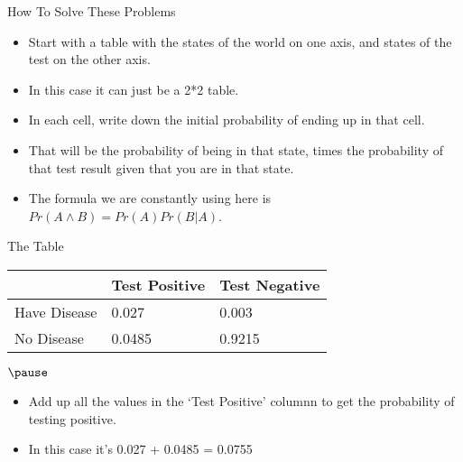 \documentclass[
  ignorenonframetext,
]{beamer}
\providecommand{\tightlist}{%
  \setlength{\itemsep}{0pt}\setlength{\parskip}{0pt}}
\renewcommand{\,}{\text{, }}
\begin{document}
\begin{frame}{How To Solve These Problems}
\protect\hypertarget{how-to-solve-these-problems}{}

\begin{itemize}
\tightlist
\item
  Start with a table with the states of the world on one axis, and
  states of the test on the other axis.
\item
  In this case it can just be a 2*2 table.
\item
  In each cell, write down the initial probability of ending up in that
  cell.
\item
  That will be the probability of being in that state, times the
  probability of that test result given that you are in that state.
\item
  The formula we are constantly using here is
  \(Pr(A \wedge B) = Pr(A) Pr(B | A)\).
\end{itemize}

\end{frame}

\begin{frame}{The Table}
\protect\hypertarget{the-table}{}

\begin{longtable}[]{@{}lll@{}}
\toprule
& Test Positive & Test Negative\tabularnewline
\midrule
\endhead
Have Disease & 0.027 & 0.003\tabularnewline
No Disease & 0.0485 & 0.9215\tabularnewline
\bottomrule
\end{longtable}

\(\pause\)

\begin{itemize}
\tightlist
\item
  Add up all the values in the `Test Positive' columnn to get the
  probability of testing positive.
\item
  In this case it's 0.027 + 0.0485 = 0.0755
\end{itemize}

\end{frame}
\end{document}
